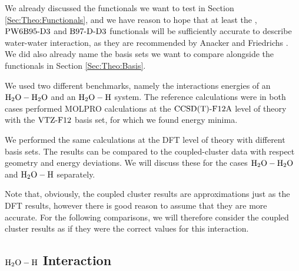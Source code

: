 \documentclass[8.5pt,twoside,twocolumn]{article}
\theoremstyle{standard}
\begin{document}
We already
discussed the functionals we want to test in Section \ref{Sec:Theo:Functionals}, and we
have reason to hope that at least the \pbez, $\text{PW6B95}\text{-D3}$ and $\text{B97-D}\text{-D3}$ functionals will be sufficiently
accurate to describe water-water interaction, as they are recommended by Anacker and Friedrichs \cite{Anacker2014}.
We did also already name the basis sets we want to compare alongside the functionals in Section \ref{Sec:Theo:Basis}.

We used two different benchmarks, namely the interactions energies of an $\text H _2 \text O-\text H _2 \text O$ and an $\text H _2 \text O-\text H$ system.
The reference calculations were in both cases performed MOLPRO \cite{MOLPRO_brief} calculations
at the $\text{CCSD(T)-F12A}$ \cite{CCSDTF12} level of theory with the $\text{VTZ-F}12$\cite{VTZ} basis set, for
which we found energy minima. 

We performed the same calculations at the DFT level of theory with different basis sets. The results can be compared
to the coupled-cluster data with respect geometry and energy deviations. We will discuss these for the cases $\text H _2 \text O-\text H _2 \text O$ and $\text H _2 \text O-\text H$
separately.

Note that, obviously, the coupled cluster results are approximations just as the DFT results, however
there is good reason to assume that they are more accurate. For the following comparisons, we will
therefore consider the coupled cluster results as if they were the correct values for this
interaction.

\subsection{$\text H _2 \text O-\text H$ Interaction}

\end{document}
